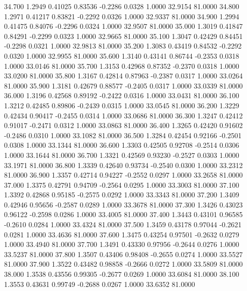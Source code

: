   34.700   1.2949   0.41025   0.83536  -0.2286   0.0328   1.0000  32.9154  81.0000
  34.800   1.2971   0.41217   0.83821  -0.2292   0.0326   1.0000  32.9337  81.0000
  34.900   1.2994   0.41475   0.84076  -0.2296   0.0324   1.0000  32.9507  81.0000
  35.000   1.3019   0.41847   0.84291  -0.2299   0.0323   1.0000  32.9665  81.0000
  35.100   1.3047   0.42429   0.84451  -0.2298   0.0321   1.0000  32.9813  81.0000
  35.200   1.3083   0.43419   0.84532  -0.2292   0.0320   1.0000  32.9955  81.0000
  35.600   1.3140   0.43141   0.86744  -0.2353   0.0318   1.0000  33.0146  81.0000
  35.700   1.3153   0.42968   0.87352  -0.2370   0.0318   1.0000  33.0200  81.0000
  35.800   1.3167   0.42814   0.87963  -0.2387   0.0317   1.0000  33.0264  81.0000
  35.900   1.3181   0.42679   0.88577  -0.2405   0.0317   1.0000  33.0339  81.0000
  36.000   1.3196   0.42568   0.89192  -0.2422   0.0316   1.0000  33.0431  81.0000
  36.100   1.3212   0.42485   0.89806  -0.2439   0.0315   1.0000  33.0545  81.0000
  36.200   1.3229   0.42434   0.90417  -0.2455   0.0314   1.0000  33.0686  81.0000
  36.300   1.3247   0.42412   0.91017  -0.2471   0.0312   1.0000  33.0863  81.0000
  36.400   1.3265   0.42420   0.91602  -0.2486   0.0310   1.0000  33.1082  81.0000
  36.500   1.3284   0.42454   0.92166  -0.2501   0.0308   1.0000  33.1344  81.0000
  36.600   1.3303   0.42505   0.92708  -0.2514   0.0306   1.0000  33.1644  81.0000
  36.700   1.3321   0.42569   0.93230  -0.2527   0.0303   1.0000  33.1971  81.0000
  36.800   1.3339   0.42640   0.93734  -0.2540   0.0300   1.0000  33.2312  81.0000
  36.900   1.3357   0.42714   0.94227  -0.2552   0.0297   1.0000  33.2658  81.0000
  37.000   1.3375   0.42791   0.94709  -0.2564   0.0295   1.0000  33.3003  81.0000
  37.100   1.3392   0.42868   0.95185  -0.2575   0.0292   1.0000  33.3343  81.0000
  37.200   1.3409   0.42946   0.95656  -0.2587   0.0289   1.0000  33.3678  81.0000
  37.300   1.3426   0.43023   0.96122  -0.2598   0.0286   1.0000  33.4005  81.0000
  37.400   1.3443   0.43101   0.96585  -0.2610   0.0284   1.0000  33.4324  81.0000
  37.500   1.3459   0.43178   0.97044  -0.2621   0.0281   1.0000  33.4636  81.0000
  37.600   1.3475   0.43254   0.97501  -0.2632   0.0279   1.0000  33.4940  81.0000
  37.700   1.3491   0.43330   0.97956  -0.2644   0.0276   1.0000  33.5237  81.0000
  37.800   1.3507   0.43406   0.98408  -0.2655   0.0274   1.0000  33.5527  81.0000
  37.900   1.3522   0.43482   0.98858  -0.2666   0.0272   1.0000  33.5809  81.0000
  38.000   1.3538   0.43556   0.99305  -0.2677   0.0269   1.0000  33.6084  81.0000
  38.100   1.3553   0.43631   0.99749  -0.2688   0.0267   1.0000  33.6352  81.0000
